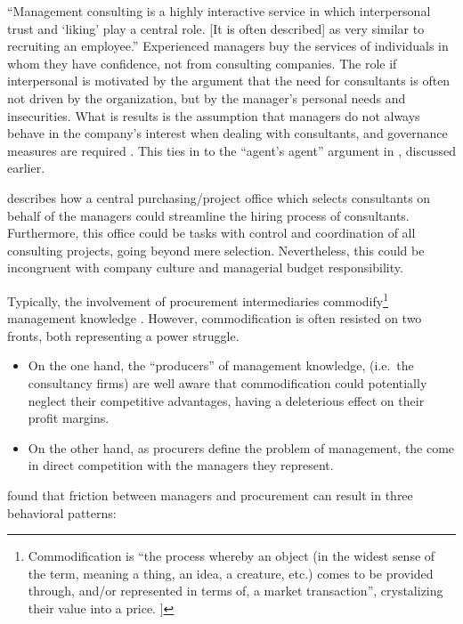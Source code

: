\documentclass[12pt]{article}
\begin{document}
``Management consulting is a highly interactive service in which
interpersonal trust and `liking' play a central role. {[}It is often
described{]} as very similar to recruiting an employee.'' \citep[
185]{furusten2005} Experienced managers buy the services of individuals
in whom they have confidence, not from consulting companies. The role if
interpersonal is motivated by the argument that the need for consultants
is often not driven by the organization, but by the manager's personal
needs and insecurities. What is results is the assumption that managers
do not always behave in the company's interest when dealing with
consultants, and governance measures are required \citep[
300]{honer2006}. This ties in to the ``agent's agent'' argument in
\citet{fincham2002}, discussed earlier.

\citet[307]{honer2006} describes how a central purchasing/project office
which selects consultants on behalf of the managers could streamline the
hiring process of consultants. Furthermore, this office could be tasks
with control and coordination of all consulting projects, going beyond
mere selection. Nevertheless, this could be incongruent with company
culture and managerial budget responsibility.

Typically, the involvement of procurement intermediaries
commodify\footnote{Commodification is ``the process whereby an object
  (in the widest sense of the term, meaning a thing, an idea, a
  creature, etc.) comes to be provided through, and/or represented in
  terms of, a market transaction'', crystalizing their value into a
  price. \citep{carvalho2008}{]}} management knowledge \citep[
205-206]{omahoney2013}. However, commodification is often resisted on
two fronts, both representing a power struggle.

\begin{itemize}
\item
  On the one hand, the ``producers'' of management knowledge, (i.e.~the
  consultancy firms) are well aware that commodification could
  potentially neglect their competitive advantages, having a deleterious
  effect on their profit margins.
\item
  On the other hand, as procurers define the problem of management, the
  come in direct competition with the managers they represent.
\end{itemize}

\citet[305-306]{honer2006} found that friction between managers and
procurement can result in three behavioral patterns:
\end{document}
